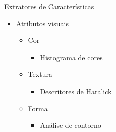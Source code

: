\documentclass{beamer}
\begin{document}
\begin{frame}{Extratores de Características}
  \begin{itemize}
   \item Atributos visuais\newline
   \begin{itemize}
      \item Cor
	  \begin{itemize}
	      \item Histograma de cores\newline
	  \end{itemize}
      \item Textura
	  \begin{itemize}
	      \item Descritores de Haralick\newline
	  \end{itemize}
      \item Forma
	  \begin{itemize}
	      \item Análise de contorno\newline
	  \end{itemize}
   \end{itemize}
   
  \end{itemize}

\end{frame}
\end{document}
